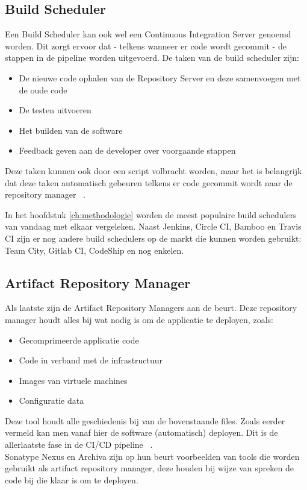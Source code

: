         \subsection{Build Scheduler}
        Een Build Scheduler kan ook wel een Continuous Integration Server genoemd worden.
        Dit zorgt ervoor dat - telkens wanneer er code wordt gecommit - de stappen in de pipeline worden uitgevoerd. De taken van de build scheduler zijn: 
        \begin{itemize}
            \item De nieuwe code ophalen van de Repository Server en deze samenvoegen met de oude code
            \item De testen uitvoeren
            \item Het builden van de software
            \item Feedback geven aan de developer over voorgaande stappen
        \end{itemize}
        Deze taken kunnen ook door een script volbracht worden, maar het is belangrijk dat deze taken automatisch gebeuren telkens er code gecommit wordt naar de repository manager ~\autocite{Riti2018}.
    
        In het hoofdstuk \ref{ch:methodologie} worden de meest populaire build schedulers van vandaag met elkaar vergeleken. Naast Jenkins, Circle CI, Bamboo en Travis CI zijn er nog andere build schedulers op de markt die kunnen worden gebruikt: Team City, Gitlab CI, CodeShip en nog enkelen.
        
        
        \subsection{Artifact Repository Manager}
        Als laatste zijn de Artifact Repository Managers aan de beurt. Deze repository manager houdt alles bij wat nodig is om de applicatie te deployen, zoals:
        \begin{itemize}
            \item Gecomprimeerde applicatie code
            \item Code in verband met de infrastructuur
            \item Images van virtuele machines
            \item Configuratie data
        \end{itemize}
        Deze tool houdt alle geschiedenis bij van de bovenstaande files. Zoals eerder vermeld kan men vanaf hier de software (automatisch) deployen. Dit is de allerlaatste fase in de CI/CD pipeline ~\autocite{Skelton2014}.\\
        Sonatype Nexus en Archiva zijn op hun beurt voorbeelden van tools die worden gebruikt als artifact repository manager, deze houden bij wijze van spreken de code bij die klaar is om te deployen. 
    
